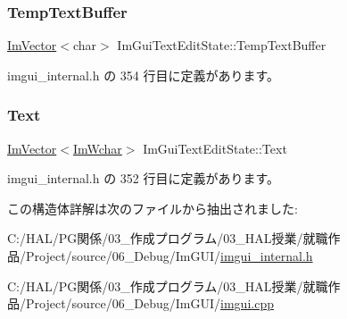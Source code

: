 \subsubsection{\texorpdfstring{Temp\+Text\+Buffer}{TempTextBuffer}}
{\footnotesize\ttfamily \mbox{\hyperlink{class_im_vector}{Im\+Vector}}$<$char$>$ Im\+Gui\+Text\+Edit\+State\+::\+Temp\+Text\+Buffer}



 imgui\+\_\+internal.\+h の 354 行目に定義があります。

\mbox{\label{struct_im_gui_text_edit_state_a5c387aca48db34089a3c0ff251ff06fc}} 
\subsubsection{\texorpdfstring{Text}{Text}}
{\footnotesize\ttfamily \mbox{\hyperlink{class_im_vector}{Im\+Vector}}$<$\mbox{\hyperlink{imgui_8h_af2c7badaf05a0008e15ef76d40875e97}{Im\+Wchar}}$>$ Im\+Gui\+Text\+Edit\+State\+::\+Text}



 imgui\+\_\+internal.\+h の 352 行目に定義があります。



この構造体詳解は次のファイルから抽出されました\+:\begin{DoxyCompactItemize}
\item 
C\+:/\+H\+A\+L/\+P\+G関係/03\+\_\+作成プログラム/03\+\_\+\+H\+A\+L授業/就職作品/\+Project/source/06\+\_\+\+Debug/\+Im\+G\+U\+I/\mbox{\hyperlink{imgui__internal_8h}{imgui\+\_\+internal.\+h}}\item 
C\+:/\+H\+A\+L/\+P\+G関係/03\+\_\+作成プログラム/03\+\_\+\+H\+A\+L授業/就職作品/\+Project/source/06\+\_\+\+Debug/\+Im\+G\+U\+I/\mbox{\hyperlink{imgui_8cpp}{imgui.\+cpp}}\end{DoxyCompactItemize}
